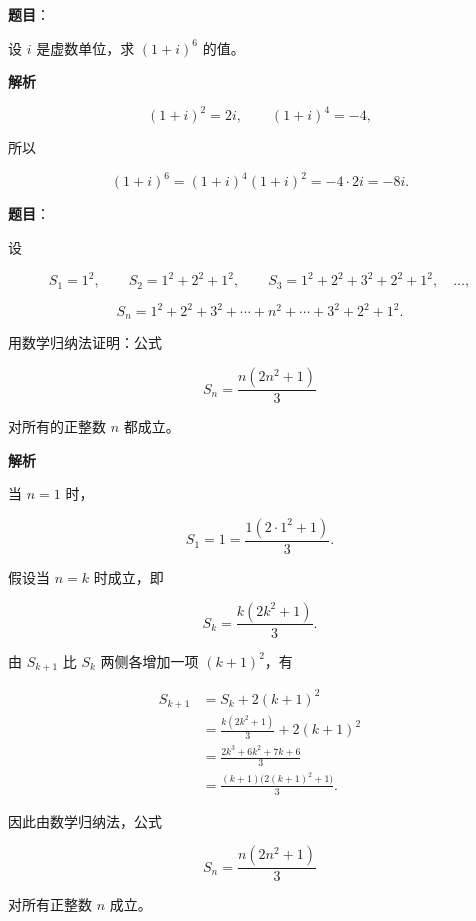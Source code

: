 \begin{answer}

\textbf{题目}：

设 $i$ 是虚数单位，求 $(1+i)^6$ 的值。

\textbf{解析}

\nopagebreak[4]
\[
(1+i)^2=2i,\qquad
(1+i)^4=-4,
\]

所以

\nopagebreak[4]
\[
(1+i)^6=(1+i)^4(1+i)^2=-4\cdot2i=-8i.
\]


\end{answer}
\begin{answer}

\textbf{题目}：

设

\nopagebreak[4]
\[
S_1=1^2,\qquad
S_2=1^2+2^2+1^2,\qquad
S_3=1^2+2^2+3^2+2^2+1^2,\quad\ldots,
\]

\nopagebreak[4]
\[
S_n=1^2+2^2+3^2+\cdots+n^2+\cdots+3^2+2^2+1^2.
\]

用数学归纳法证明：公式

\nopagebreak[4]
\[
S_n=\frac{n(2n^2+1)}{3}
\]

对所有的正整数 $n$ 都成立。

\textbf{解析}

当 $n=1$ 时，

\nopagebreak[4]
\[
S_1=1=\frac{1(2\cdot1^2+1)}3.
\]

假设当 $n=k$ 时成立，即

\nopagebreak[4]
\[
S_k=\frac{k(2k^2+1)}3.
\]

由 $S_{k+1}$ 比 $S_k$ 两侧各增加一项 $(k+1)^2$，有

\nopagebreak[4]
\[
\begin{aligned}
S_{k+1}
&=S_k+2(k+1)^2\\
&=\frac{k(2k^2+1)}3+2(k+1)^2\\
&=\frac{2k^3+6k^2+7k+6}{3}\\
&=\frac{(k+1)\bigl(2(k+1)^2+1\bigr)}3.
\end{aligned}
\]

因此由数学归纳法，公式

\nopagebreak[4]
\[
S_n=\frac{n(2n^2+1)}3
\]

对所有正整数 $n$ 成立。


\end{answer}
